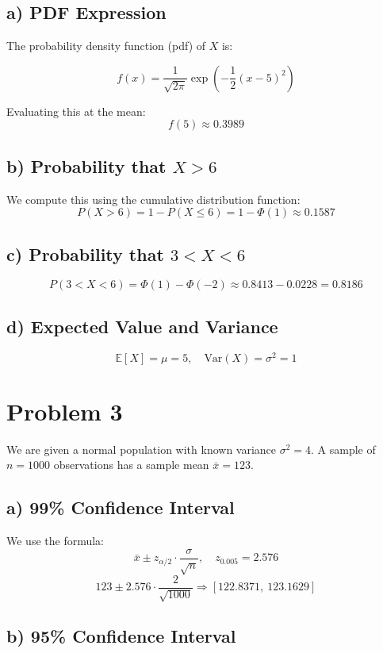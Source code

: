 \documentclass[12pt]{article}
\begin{document}
\subsection*{a) PDF Expression}

The probability density function (pdf) of $X$ is:

\[
f(x) = \frac{1}{\sqrt{2\pi}} \exp\left(-\frac{1}{2}(x - 5)^2\right)
\]

Evaluating this at the mean:
\[
f(5) \approx 0.3989
\]

\subsection*{b) Probability that $X > 6$}

We compute this using the cumulative distribution function:
\[
P(X > 6) = 1 - P(X \leq 6) = 1 - \Phi(1) \approx 0.1587
\]

\subsection*{c) Probability that $3 < X < 6$}

\[
P(3 < X < 6) = \Phi(1) - \Phi(-2) \approx 0.8413 - 0.0228 = 0.8186
\]

\subsection*{d) Expected Value and Variance}

\[
\mathbb{E}[X] = \mu = 5, \quad \text{Var}(X) = \sigma^2 = 1
\]


\section*{Problem 3}

We are given a normal population with known variance $\sigma^2 = 4$. A sample of $n = 1000$ observations has a sample mean $\bar{x} = 123$.

\subsection*{a) 99\% Confidence Interval}

We use the formula:
\[
\bar{x} \pm z_{\alpha/2} \cdot \frac{\sigma}{\sqrt{n}}, \quad z_{0.005} = 2.576
\]
\[
123 \pm 2.576 \cdot \frac{2}{\sqrt{1000}} \Rightarrow [122.8371,\ 123.1629]
\]

\subsection*{b) 95\% Confidence Interval}
\end{document}
